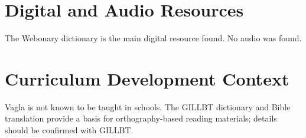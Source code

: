 \documentclass[12pt]{article}
\begin{document}
\section{Digital and Audio Resources}
The Webonary dictionary is the main digital resource found. No audio was found.
\section{Curriculum Development Context}
Vagla is not known to be taught in schools. The GILLBT dictionary and Bible translation provide a basis for orthography-based reading materials; details should be confirmed with GILLBT.
\end{document}
